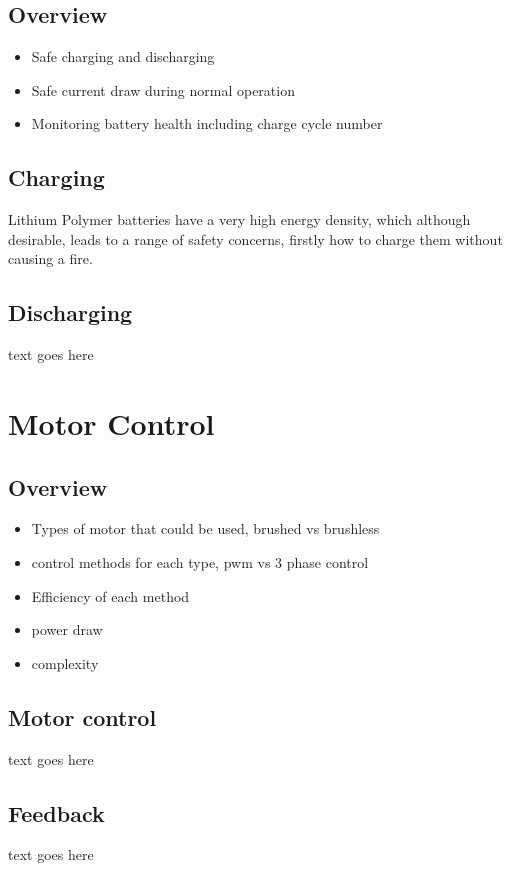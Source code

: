 \documentclass[journal,10pt]{IEEEtran}
\begin{document}
	\subsection{Overview}
		\begin{itemize}
			\item Safe charging and discharging 
			\item Safe current draw during normal operation
			\item Monitoring battery health including charge cycle number
		\end{itemize}
	\subsection{Charging}
		Lithium Polymer batteries have a very high energy density, which although desirable, leads to a range of safety concerns, firstly how to charge them without causing a fire.
	\subsection{Discharging}
		text goes here
\section{Motor Control}
	\subsection{Overview}
		\begin{itemize}
			\item Types of motor that could be used, brushed vs brushless
			\item control methods for each type, pwm vs 3 phase control
			\item Efficiency of each method
			\item power draw
			\item complexity
		\end{itemize}
	\subsection{Motor control}
		text goes here
	\subsection{Feedback}
		text goes here
\end{document}
